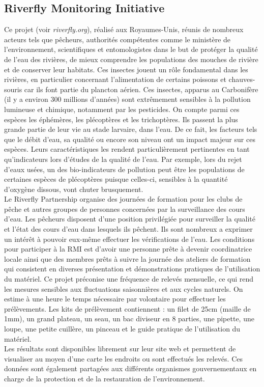 \documentclass[10pt, article]{llncs}
\begin{document}
	\subsection{Riverfly Monitoring Initiative}
		Ce projet (voir \textit{riverfly.org}), réalisé aux Royaumes-Unis, réunis de nombreux acteurs tels que pêcheurs, authorités compétentes comme le ministère de l'environnement, scientifiques et entomologistes dans le but de protéger la qualité de l'eau des rivières, de mieux comprendre les populations des mouches de rivière et de conserver leur habitats. Ces insectes jouent un rôle fondamental dans les rivières, en particulier concernant l'alimentation de certains poissons et chauves-souris car ils font partie du plancton aérien. Ces insectes, apparus au Carbonifère (il y a environ 300 millions d'années) sont extrêmement sensibles à la pollution lumineuse et chimique, notamment par les pesticides. On compte parmi ces espèces les éphémères, les plécoptères et les trichoptères. Ils passent la plus grande partie de leur vie au stade larvaire, dans l'eau. De ce fait, les facteurs tels que le débit d'eau, sa qualité ou encore son niveau ont un impact majeur sur ces espèces. Leurs caractéristiques les rendent particulièrement pertinentes en tant qu'indicateurs lors d'études de la qualité de l'eau. Par exemple, lors du rejet d'eaux usées, un des bio-indicateurs de pollution peut être les populations de certaines espèces de plécoptères puisque celles-ci, sensibles à la quantité d'oxygène dissous, vont chuter brusquement. \\
		Le Riverfly Partnership organise des journées de formation pour les clubs de pêche et autres groupes de personnes concernées par la surveillance des cours d'eau. Les pêcheurs disposent d'une position privilégiée pour surveiller la qualité et l'état des cours d'eau dans lesquels ils pêchent. Ils sont nombreux a exprimer un intérêt à pouvoir eux-même effectuer les vérifications de l'eau. Les conditions pour participer à la RMI est d'avoir une personne prête à devenir coordinatrice locale ainsi que des membres prêts à suivre la journée des ateliers de formation qui consistent en diverses présentation et démonstrations pratiques de l'utilisation du matériel. 
		Ce projet préconise une fréquence de relevés mensuelle, ce qui rend les mesures sensibles aux fluctuations saisonnières et aux cycles naturels. On estime à une heure le temps nécessaire par volontaire pour effectuer les prélèvements. Les kits de prélèvement contiennent : un filet de 25cm (maille de 1mm), un grand plateau, un seau, un bac diviseur en 8 parties, une pipette, une loupe, une petite cuillère, un pinceau et le guide pratique de l'utilisation du matériel.\\
		Les résultats sont disponibles librement sur leur site web et permettent de visualiser au moyen d'une carte les endroits ou sont effectués les relevés. Ces données sont également partagées aux différents organismes gouvernementaux en charge de la protection et de la restauration de  l'environnement.
	
\end{document}

